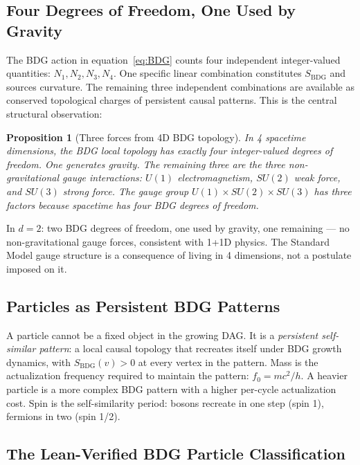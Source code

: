 \documentclass[11pt,a4paper]{article}
\newtheorem{proposition}[theorem]{Proposition}
\newcommand{\SBDG}{S_{\mathrm{BDG}}}
\begin{document}
\subsection{Four Degrees of Freedom, One Used by Gravity}

The BDG action in equation~\eqref{eq:BDG} counts four independent
integer-valued quantities: $N_1, N_2, N_3, N_4$. One specific linear
combination constitutes $\SBDG$ and sources curvature. The remaining
three independent combinations are available as conserved topological
charges of persistent causal patterns. This is the central structural
observation:

\begin{proposition}[Three forces from 4D BDG topology]
\label{prop:three_forces}
In 4 spacetime dimensions, the BDG local topology has exactly four
integer-valued degrees of freedom. One generates gravity. The remaining
three are the three non-gravitational gauge interactions:
$U(1)$ electromagnetism, $SU(2)$ weak force, and $SU(3)$ strong force.
The gauge group $U(1)\times SU(2)\times SU(3)$ has three factors because
spacetime has four BDG degrees of freedom.
\end{proposition}

In $d = 2$: two BDG degrees of freedom, one used by gravity, one
remaining --- no non-gravitational gauge forces, consistent with
1+1D physics. The Standard Model gauge structure is a consequence of
living in 4 dimensions, not a postulate imposed on it.

\subsection{Particles as Persistent BDG Patterns}

A particle cannot be a fixed object in the growing DAG. It is a
\emph{persistent self-similar pattern}: a local causal topology that
recreates itself under BDG growth dynamics, with $\SBDG(v) > 0$ at
every vertex in the pattern. Mass is the actualization frequency required
to maintain the pattern: $f_0 = mc^2/h$. A heavier particle is a more
complex BDG pattern with a higher per-cycle actualization cost.
Spin is the self-similarity period: bosons recreate in one step (spin 1),
fermions in two (spin 1/2).

\subsection{The Lean-Verified BDG Particle Classification}
\end{document}
